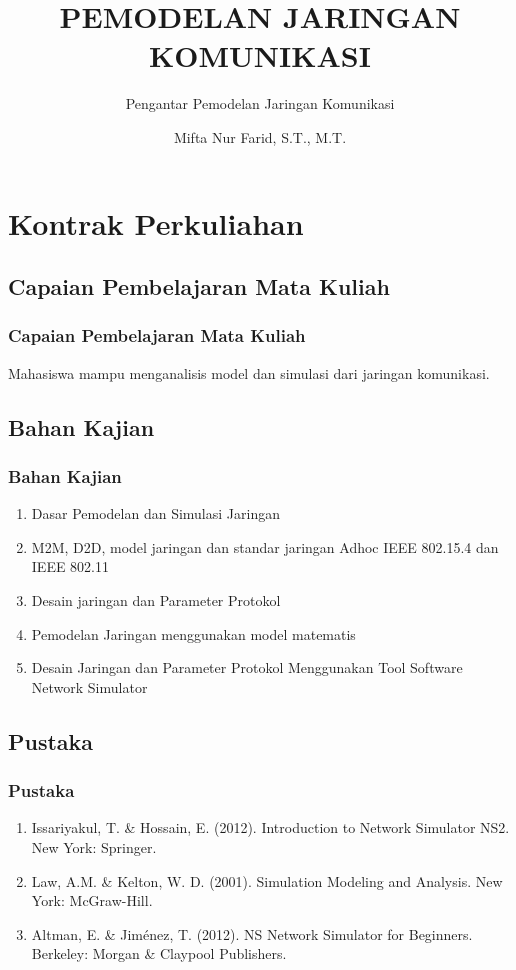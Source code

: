 \documentclass[pdflatex,compress]{beamer}
\title{PEMODELAN JARINGAN KOMUNIKASI}
\subtitle{Pengantar Pemodelan Jaringan Komunikasi}
\author{Mifta Nur Farid, S.T., M.T.}
\begin{document}
\maketitle


\section{Kontrak Perkuliahan}
\subsection{Capaian Pembelajaran Mata Kuliah}
\begin{frame}
	\frametitle{Capaian Pembelajaran Mata Kuliah}
	Mahasiswa mampu menganalisis model dan simulasi dari jaringan komunikasi.
\end{frame}

\subsection{Bahan Kajian}
\begin{frame}
	\frametitle{Bahan Kajian}
	\begin{enumerate}
		\item Dasar Pemodelan dan Simulasi Jaringan
		\item M2M, D2D, model jaringan dan standar jaringan Adhoc IEEE 802.15.4 dan IEEE 802.11
		\item Desain jaringan dan Parameter Protokol
		\item Pemodelan Jaringan menggunakan model matematis
		\item Desain Jaringan dan Parameter Protokol Menggunakan Tool Software Network Simulator
	\end{enumerate}
\end{frame}

\subsection{Pustaka}
\begin{frame}
	\frametitle{Pustaka}
	\begin{enumerate}
		\item Issariyakul, T. \& Hossain, E. (2012). Introduction to Network Simulator NS2. New York: Springer.
		\item Law, A.M. \& Kelton, W. D. (2001). Simulation Modeling and Analysis. New York: McGraw-Hill.
		\item Altman, E. \& Jiménez, T. (2012). NS Network Simulator for Beginners. Berkeley: Morgan \& Claypool
		Publishers.
	\end{enumerate}
\end{frame}
\end{document}
